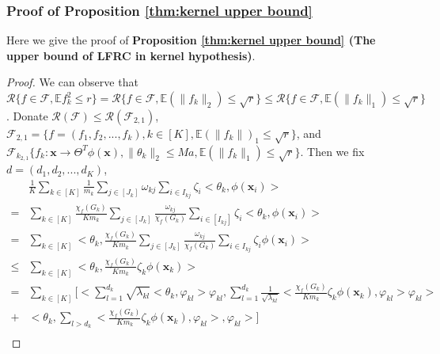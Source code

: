 \documentclass{article}
\def\vx{{\mathbf{x}}}
\def\eE{\mathbb{E}}
\begin{document}
\subsubsection{Proof of Proposition \ref{thm:kernel upper bound}}
\label{pro:proposition1_proof}
Here we give the proof of \textbf{Proposition \ref{thm:kernel upper bound} (The upper bound of LFRC in kernel hypothesis)}. 
\begin{proof} 
We can  observe that   $    \mathcal{R}\{ f \in \mathcal{F}, \eE f_k^2 \leq r \} = \mathcal{R}\{ f \in \mathcal{F}, \eE(\|f_k\|_2) \leq \sqrt{r} \} \leq \mathcal{R}\{f \in \mathcal{F}, \eE (\|f_k\|_1) \leq \sqrt{r}\}$.
Donate $\mathcal{R}(\mathcal{F}) \leq \mathcal{R} (\mathcal{F}_{2,1})$, $\mathcal{F}_{2,1} = \{ f = (f_1,f_2,...,f_k), k \in [K], \eE (\|f_k\|)_1 \leq \sqrt{r} \}$, and $\mathcal{F}_{k_{2,1}}
 \{ f_k : \vx \rightarrow \Theta^T \phi (\vx), \|\theta_k\|_2 \leq Ma, \eE(\|f_k\|_1) \leq \sqrt{r} \}$. Then we fix $d = (d_1,d_2,...,d_K)$, 
\begin{align*}
    & \frac{1}{K} \sum _{k \in [K]} \frac{1}{m_k} \sum _{j \in [J_k]} \omega_{kj} \sum _{i \in I_{kj}} \zeta_i < \theta_k, \phi (\vx_i)> \\
    = & \sum _{k \in [K]} \frac{\chi_f(G_k)}{K m_k} \sum _{j \in [J_k]} \frac{\omega_{kj}}{\chi_f(G_k)} \sum _{i \in [I_{kj}]} \zeta_i <\theta_k, \phi(\vx_i)> \\
     = &  \sum _{k \in [K]}  <\theta_k, \frac{\chi _f(G_k)}{K m_k} \sum _{j \in [J_k]} \frac{\omega_{kj}}{\chi _f(G_k)} \sum _{i \in I_{kj}} \zeta_i \phi (\vx_i)> \\  
     \leq & \sum _{k \in [K]}  <\theta_k, \frac{\chi _f(G_k)}{K m_k} \zeta_k \phi(\vx_k) > \\
     =  & \sum _{k \in [K]} [ <\sum _{l = 1}^{d_k} \sqrt{\lambda _{kl}}<\theta_k, \varphi _{kl}>\varphi _{kl} , \sum _{l = 1}^{d_k} \frac{1}{\sqrt{ \lambda _{kl}}} <\frac{\chi_f(G_k)}{K m_k} \zeta_k \phi (\vx_k) , \varphi _{kl} > \varphi _{kl}> \\ + & <\theta_k, \sum _{l > d_k} <\frac{\chi_f(G_k)}{K m_k} \zeta_k \phi (\vx_k), \varphi _{kl} >, \varphi _{kl}>] \\

\end{align*}
\end{proof}
\end{document}
